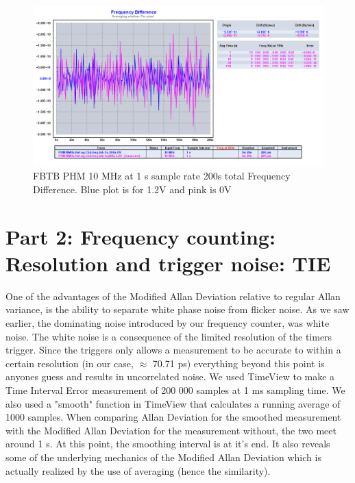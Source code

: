 \documentclass[11pt,english,a4paper]{article}
\begin{document}
\begin{figure}[!htb]
  \centering
    \includegraphics[width=1\textwidth]{PHM10MHz-Ref-og-ChA-freq-btb-1s-200s-frec_diff.png}
    \caption{FBTB PHM 10 MHz at 1 s sample rate 200s total Frequency Difference. Blue plot is for 1.2V and pink is 0V}
        \label{fig:PHM_10MHz_0V_1.2V_freq_diff}
\end{figure}

\newpage
\section{Part 2: Frequency counting: Resolution and trigger noise: TIE}
One of the advantages of the Modified Allan Deviation relative to regular Allan variance, is the ability to separate white phase noise from flicker noise. As we saw earlier, the dominating noise introduced by our frequency counter, was white noise. The white noise is a consequence of the limited resolution of the timers trigger. Since the triggers only allows a measurement to be accurate to within a certain resolution (in our case, $\approx$ 70.71 ps) everything beyond this point is anyones guess and results in uncorrelated noise. We used TimeView to make a Time Interval Error measurement of 200 000 samples at 1 ms sampling time. We also used a "smooth" function in TimeView that calculates a running average of 1000 samples. When comparing Allan Deviation for the smoothed measurement with the Modified Allan Deviation for the measurement without, the two meet around 1 s. At this point, the smoothing interval is at it's end. It also reveals some of the underlying mechanics of the Modified Allan Deviation which is actually realized by the use of averaging (hence the similarity).
\end{document}
